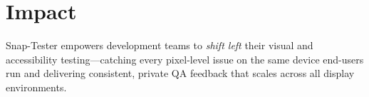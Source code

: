 \documentclass[11pt,a4paper]{article}
\newcommand{\sectionline}{
  \nointerlineskip \vspace{1.5ex}
  \par\noindent\makebox[\linewidth]{\rule{\linewidth}{0.4pt}}
  \vspace{1ex}
}
\begin{document}
\sectionline

\section*{Impact}
Snap-Tester empowers development teams to \emph{shift left} their visual and accessibility testing—catching every pixel-level issue on the same device end-users run and delivering consistent, private QA feedback that scales across all display environments.

\vspace{2ex}
\end{document}

